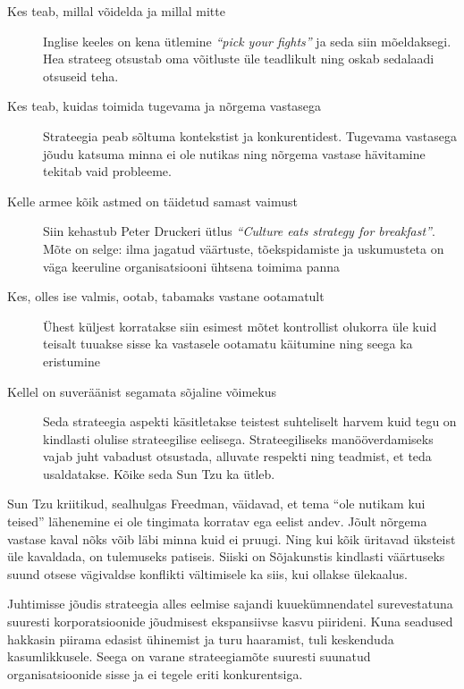 \documentclass{tufte-book}
\begin{document}
\begin{description}
	\item[Kes teab, millal võidelda ja millal mitte] Inglise keeles on kena ütlemine \emph{\enquote{pick your fights}} ja seda siin mõeldaksegi. Hea strateeg otsustab oma võitluste üle teadlikult ning oskab sedalaadi otsuseid teha.
	\item[Kes teab, kuidas toimida tugevama ja nõrgema vastasega] Strateegia peab sõltuma kontekstist ja konkurentidest. Tugevama vastasega jõudu katsuma minna ei ole nutikas ning nõrgema vastase hävitamine tekitab vaid probleeme.
	\item[Kelle armee kõik astmed on täidetud samast vaimust] Siin kehastub Peter Druckeri ütlus \emph{\enquote{Culture eats strategy for breakfast}}. Mõte on selge: ilma jagatud väärtuste, tõekspidamiste ja uskumusteta on väga keeruline organisatsiooni ühtsena toimima panna
	\item[Kes, olles ise valmis, ootab, tabamaks vastane ootamatult] Ühest küljest korratakse siin esimest mõtet kontrollist olukorra üle kuid teisalt tuuakse sisse ka vastasele ootamatu käitumine ning seega ka eristumine
	\item[Kellel on suveräänist segamata sõjaline võimekus] Seda strateegia aspekti käsitletakse teistest suhteliselt harvem kuid tegu on kindlasti olulise strateegilise eelisega. Strateegiliseks manööverdamiseks vajab juht vabadust otsustada, alluvate respekti ning teadmist, et teda usaldatakse. Kõike seda Sun Tzu ka ütleb. 
\end{description}

Sun Tzu kriitikud, sealhulgas Freedman, väidavad, et tema \enquote{ole nutikam kui teised} lähenemine ei ole tingimata korratav ega eelist andev. Jõult nõrgema vastase kaval nõks võib läbi minna kuid ei pruugi. Ning kui kõik üritavad üksteist üle kavaldada, on tulemuseks patiseis. Siiski on Sõjakunstis kindlasti väärtuseks suund otsese vägivaldse konflikti vältimisele ka siis, kui ollakse ülekaalus.

Juhtimisse jõudis strateegia alles eelmise sajandi kuuekümnendatel surevestatuna suuresti korporatsioonide jõudmisest ekspansiivse kasvu piirideni. Kuna seadused hakkasin piirama edasist ühinemist ja turu haaramist, tuli keskenduda kasumlikkusele. Seega on varane strateegiamõte suuresti suunatud organisatsioonide sisse ja ei tegele eriti konkurentsiga. 
\end{document}
